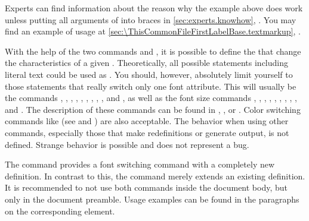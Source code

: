     \else %
      Experts can find information about the reason why the example above does
      work unless putting all arguments of  into braces in
      \autoref{sec:experts.knowhow},
      .%
    \fi
  \else
    You may find an example of usage at
    \autoref{sec:\ThisCommonFileFirstLabelBase.textmarkup},
    .
  \fi%
  \EndIndexGroup%
\fi


\begin{Declaration}
\end{Declaration}%
With the help of the two commands  and
, it is possible to define the  that
change the characteristics of a given . Theoretically, all
possible statements including literal text could be used as .
You should, however, absolutely limit yourself to those
statements that really switch only one font attribute. This will usually be
the commands , , ,
, , , ,
, , and , as well as the font
size commands , , , ,
, , , ,
, and . The description of these commands can be
found in \cite{lshort}, \cite{latex:usrguide}, or \cite{latex:fntguide}. Color
switching commands like  (see \cite{package:graphics} and
\cite{package:xcolor}) are also acceptable.  The behavior when using other
commands, especially those that make redefinitions or generate output, is not
defined. Strange behavior is possible and does not represent a bug.

The command  provides a font switching command with a
completely new definition. In contrast to this, the 
command merely extends an existing definition. It is recommended to not use
both commands inside the document body, but only in the document preamble.
Usage examples can be found in the paragraphs on the corresponding element.

